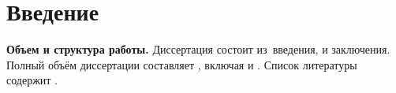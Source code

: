 \chapter*{Введение}                         %

\newcommand{\actuality}{}
\newcommand{\progress}{}
\newcommand{\aim}{{\textbf\aimTXT}}
\newcommand{\tasks}{\textbf{\tasksTXT}}
\newcommand{\novelty}{\textbf{\noveltyTXT}}
\newcommand{\influence}{\textbf{\influenceTXT}}
\newcommand{\methods}{\textbf{\methodsTXT}}
\newcommand{\defpositions}{\textbf{\defpositionsTXT}}
\newcommand{\reliability}{\textbf{\reliabilityTXT}}
\newcommand{\probation}{\textbf{\probationTXT}}
\newcommand{\contribution}{\textbf{\contributionTXT}}
\newcommand{\publications}{\textbf{\publicationsTXT}}

\providecommand{\tasksintro}{Для~достижения поставленной цели необходимо было решить следующие {\tasks}:}
\providecommand{\theory}{\textbf{Теоретическая значимость.}}


\textbf{Объем и структура работы.} Диссертация состоит из~введения,
и заключения.
%
Полный объём диссертации составляет
, включая
 и
.
Список литературы содержит
.
